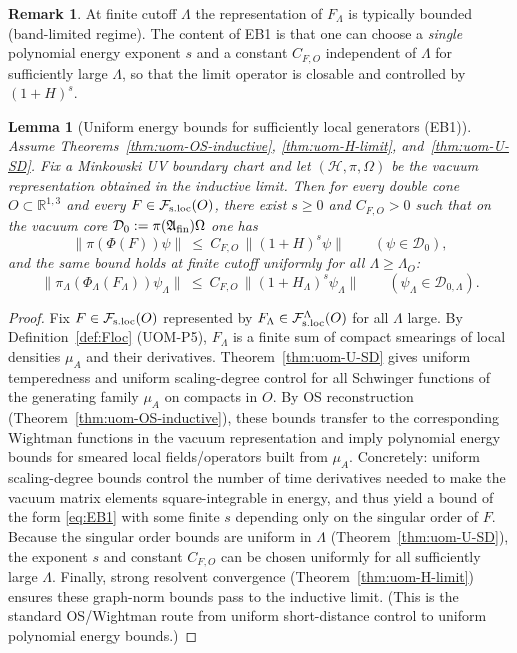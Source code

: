\documentclass[10pt]{article}
\newcommand{\Fsloc}{\mathcal F_{\rm s.loc}}
\theoremstyle{definition}
\newtheorem{remark}{Remark}[section]
\theoremstyle{plain}
\newtheorem{lemma}{Lemma}[section]
\begin{document}
\begin{remark}
At finite cutoff $\Lambda$ the representation of $F_\Lambda$ is typically bounded (band-limited regime).
The content of EB1 is that one can choose a \emph{single} polynomial energy exponent $s$ and a constant $C_{F,O}$ independent of $\Lambda$
for sufficiently large $\Lambda$, so that the limit operator is closable and controlled by $(1+H)^s$.
\end{remark}

\begin{lemma}[Uniform energy bounds for sufficiently local generators (EB1)]
\label{lem:EB1}
Assume Theorems~\ref{thm:uom-OS-inductive}, \ref{thm:uom-H-limit}, and~\ref{thm:uom-U-SD}.
Fix a Minkowski UV boundary chart and let $(\mathcal H,\pi,\Omega)$ be the vacuum representation obtained in the inductive limit.
Then for every double cone $O\subset\mathbb R^{1,3}$ and every $F\in\Fsloc(O)$, there exist $s\ge 0$ and $C_{F,O}>0$
such that on the vacuum core $\mathcal D_0:=\pi(\mathfrak A_{\rm fin})\Omega$ one has
\begin{equation}
\|\pi(\Phi(F))\psi\|\ \le\ C_{F,O}\,\|(1+H)^s\psi\|
\qquad(\psi\in\mathcal D_0),
\label{eq:EB1}
\end{equation}
and the same bound holds at finite cutoff uniformly for all $\Lambda\ge \Lambda_O$:
\[
\|\pi_\Lambda(\Phi_\Lambda(F_\Lambda))\psi_\Lambda\|
\ \le\ C_{F,O}\,\|(1+H_\Lambda)^s\psi_\Lambda\|
\qquad(\psi_\Lambda\in\mathcal D_{0,\Lambda}).
\]
\end{lemma}

\begin{proof}
Fix $F\in\Fsloc(O)$ represented by $F_\Lambda\in\mathcal F_{\rm s.loc}^\Lambda(O)$ for all $\Lambda$ large.
By Definition~\ref{def:Floc} (UOM-P5), $F_\Lambda$ is a finite sum of compact smearings of local densities $\mu_A$ and their derivatives.
Theorem~\ref{thm:uom-U-SD} gives uniform temperedness and uniform scaling-degree control for all Schwinger functions of the generating family
$\mu_A$ on compacts in $O$.  By OS reconstruction (Theorem~\ref{thm:uom-OS-inductive}), these bounds transfer to the corresponding Wightman
functions in the vacuum representation and imply polynomial energy bounds for smeared local fields/operators built from $\mu_A$.
Concretely: uniform scaling-degree bounds control the number of time derivatives needed to make the vacuum matrix elements square-integrable in
energy, and thus yield a bound of the form \eqref{eq:EB1} with some finite $s$ depending only on the singular order of $F$.
Because the singular order bounds are uniform in $\Lambda$ (Theorem~\ref{thm:uom-U-SD}), the exponent $s$ and constant $C_{F,O}$ can be chosen
uniformly for all sufficiently large $\Lambda$.  Finally, strong resolvent convergence (Theorem~\ref{thm:uom-H-limit}) ensures these graph-norm
bounds pass to the inductive limit.  (This is the standard OS/Wightman route from uniform short-distance control to uniform polynomial energy bounds.)
\end{proof}
\end{document}
